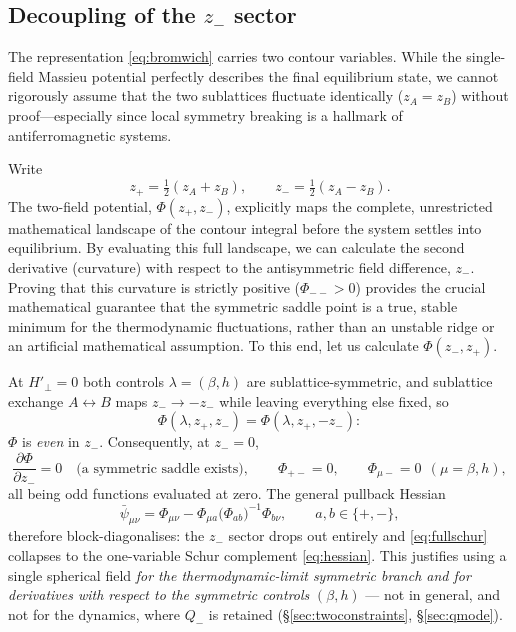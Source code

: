 \documentclass[11pt,a4paper]{article}
\begin{document}
\subsection{Decoupling of the $z_-$ sector}
\label{sec:zminus}
The representation \eqref{eq:bromwich} carries two contour variables. While the single-field Massieu potential perfectly describes the final equilibrium state, we cannot rigorously assume that the two sublattices fluctuate identically ($z_A = z_B$) without proof—especially since local symmetry breaking is a hallmark of antiferromagnetic systems. 

Write
\begin{equation}
  z_+=\tfrac12(z_A+z_B),\qquad z_-=\tfrac12(z_A-z_B).
\end{equation}
The two-field potential, $\Phi(z_+, z_-)$, explicitly maps the complete, unrestricted mathematical landscape of the contour integral before the system settles into equilibrium. By evaluating this full landscape, we can calculate the second derivative (curvature) with respect to the antisymmetric field difference, $z_-$. Proving that this curvature is strictly positive ($\Phi_{--} > 0$) provides the crucial mathematical guarantee that the symmetric saddle point is a true, stable minimum for the thermodynamic fluctuations, rather than an unstable ridge or an artificial mathematical assumption. To this end, let us calculate $\Phi(z_-,z_+)$. 

At $H'_\perp=0$ both controls $\lambda=(\beta,h)$ are sublattice-symmetric, and sublattice
exchange $A\leftrightarrow B$ maps $z_-\to-z_-$ while leaving everything else fixed, so
\begin{equation}
  \Phi(\lambda,z_+,z_-)=\Phi(\lambda,z_+,-z_-):
\end{equation}
$\Phi$ is \emph{even} in $z_-$. Consequently, at $z_-=0$,
\begin{equation}
  \frac{\partial\Phi}{\partial z_-}=0
  \quad\text{(a symmetric saddle exists)},
  \qquad
  \Phi_{+-}=0,
  \qquad
  \Phi_{\mu-}=0\ \ (\mu=\beta,h),
\end{equation}
all being odd functions evaluated at zero. The general pullback Hessian
\begin{equation}
  \bar\psi_{\mu\nu}=\Phi_{\mu\nu}-\Phi_{\mu a}\big(\Phi_{ab}\big)^{-1}\Phi_{b\nu},
  \qquad a,b\in\{+,-\},
  \label{eq:fullschur}
\end{equation}
therefore block-diagonalises: the $z_-$ sector drops out entirely and \eqref{eq:fullschur}
collapses to the one-variable Schur complement \eqref{eq:hessian}. This justifies using a
single spherical field \emph{for the thermodynamic-limit symmetric branch and for
derivatives with respect to the symmetric controls} $(\beta,h)$ --- not in general, and not
for the dynamics, where $Q_-$ is retained (\S\ref{sec:twoconstraints}, \S\ref{sec:qmode}).
\end{document}
